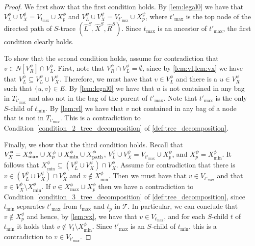 \documentclass[a4paper,UKenglish,cleveref, autoref, thm-restate, numberwithinsect]{lipics-v2021}
\newcommand{\dpath}{\textup{path}}
\begin{document}
\begin{proof}
We first show that the first condition holds. By \cref{lem:legal0} we have that $V^\phi_L\cup V^\phi_X=V_{t_{\max}}\cup X^\phi_p$ and $V^\psi_L\cup V^\psi_X=V_{t'_{\max}}\cup X^\psi_p$, where $t'_{\max}$ is the top node of the directed path of $S$-trace $(\hat{L}^S, \hat{X}^S, \hat{R}^S)$. Since $t_{\max}$ is an ancestor of $t'_{\max}$, the first condition clearly holds.


To show that the second condition holds, assume for contradiction that $v\in N[V^\psi_R]\cap V^\phi_L$. 
First, note that $V^\psi_R\cap V^\phi_L=\emptyset$, since by \cref{lem:vl,lem:vx} we have that $V^\phi_L\subseteq V^\psi_L\cup V^\psi_X$.
Therefore, we must have that $v\in V^\phi_L$ and there is a $u\in V^\psi_R$ such that $\{u,v\}\in E$. By \cref{lem:legal0} we have that $u$ is not contained in any bag in $T_{t'_{\max}}$ and also not in the bag of the parent of $t'_{\max}$. Note that $t'_{\max}$ is the only $S$-child of $t_{\min}$. By \cref{lem:vl} we have that $v$ not contained in any bag of a node that is not in $T_{t'_{\max}}$. This is a contradiction to Condition~\ref{condition_2_tree_decomposition} of \cref{def:tree_decomposition}.

Finally, we show that the third condition holds. Recall that $V^\phi_X=X^\phi_{\max}\cup X^\phi_p\cup X^\phi_{\min}\cup X^\phi_{\dpath}$, $V^\psi_L\cup V^\psi_X=V_{t'_{\max}}\cup X^\psi_p$, and $X^\psi_p=X^\phi_{\min}$. It follows that $X^\phi_{\min}\subseteq (V^\psi_L\cup V^\psi_X)\cap V^\phi_X$.
Assume for contradiction that there is $v\in (V^\psi_L\cup V^\psi_X)\cap V^\phi_X$ and $v\notin X^\phi_{\min}$. Then we must have that $v\in V_{t'_{\max}}$ and that $v\in V^\phi_X\setminus X^\phi_{\min}$. If $v\in X^\phi_{\max}\cup X^\phi_p$ then we have a contradiction to Condition~\ref{condition_3_tree_decomposition} of \cref{def:tree_decomposition}, since $t_{\min}$ separates $t'_{\max}$ from $t_{\max}$ and $t_p$ in $\mathcal{T}$. 
In particular, we can conclude that $v\notin X^\phi_p$ and hence, by \cref{lem:vx}, we have that $v\in V_{t_{\max}}$, and for each $S$-child $t$ of $t_{\min}$ it holds that $v\notin V_t\setminus X^\phi_{\min}$. Since $t'_{\max}$ is an $S$-child of $t_{\min}$, this is a contradiction to $v\in V_{t'_{\max}}$.
\end{proof}
\end{document}
